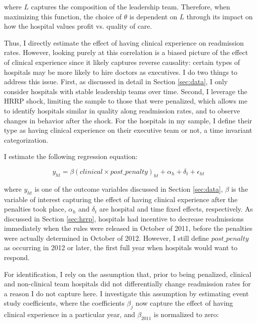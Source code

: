 \documentclass[12pt]{article}
\begin{document}
    \noindent where $L$ captures the composition of the leadership team. Therefore, when maximizing this function, the choice of $\theta$ is dependent on $L$ through its impact on how the hospital values profit vs. quality of care.

    Thus, I directly estimate the effect of having clinical experience on readmission rates. However, looking purely at this correlation is a biased picture of the effect of clinical experience since it likely captures reverse causality: certain types of hospitals may be more likely to hire doctors as executives. I do two things to address this issue. First, as discussed in detail in Section \ref{sec:data}, I only consider hospitals with stable leadership teams over time. Second, I leverage the HRRP shock, limiting the sample to those that were penalized, which allows me to identify hospitals similar in quality along readmission rates, and to observe changes in behavior after the shock. For the hospitals in my sample, I define their type as having clinical experience on their executive team or not, a time invariant categorization. 

    I estimate the following regression equation:

    \begin{equation}
    \label{eq:main}
    y_{ht} = \beta (clinical \times post\_penalty)_{ht} + \alpha_{h} + \delta_t + \epsilon_{ht}
    \end{equation}

    \noindent where $y_{ht}$ is one of the outcome variables discussed in Section \ref{sec:data}, $\beta$ is the variable of interest capturing the effect of having clinical experience after the penalties took place, $\alpha_h$ and $\delta_t$ are hospital and time fixed effects, respectively. As discussed in Section \ref{sec:hrrp}, hospitals had incentive to decrease readmissions immediately when the rules were released in October of 2011, before the penalties were actually determined in October of 2012. However, I still define $post\_penalty$ as occurring in 2012 or later, the first full year when hospitals would want to respond. 

    For identification, I rely on the assumption that, prior to being penalized, clinical and non-clinical team hospitals did not differentially change readmission rates for a reason I do not capture here. I investigate this assumption by estimating event study coefficients, where the coefficients $\beta_j$ now capture the effect of having clinical experience in a particular year, and $\beta_{2011}$ is normalized to zero:
\end{document}
